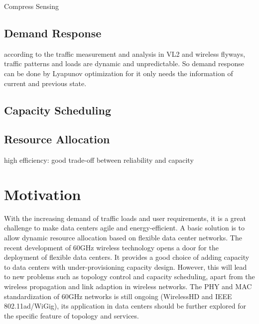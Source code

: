 \documentclass[journal,onecolumn,11pt]{IEEEtran}
\begin{document}
Compress Sensing

\subsection{Demand Response}

according to the traffic measurement and analysis in VL2 and wireless flyways, traffic patterns and loads are dynamic and unpredictable. So demand response can be done by Lyapunov optimization for it only needs the information of current and previous state.

\subsection{Capacity Scheduling}

\subsection{Resource Allocation}

high efficiency: good trade-off between reliability and capacity

\section{Motivation}

With the increasing demand of traffic loads and user requirements, it is a great challenge to make data centers agile and energy-efficient. A basic solution is to allow dynamic resource allocation based on flexible data center networks. The recent development of 60GHz wireless technology opens a door for the deployment of flexible data centers. It provides a good choice of adding capacity to data centers with under-provisioning capacity design. However, this will lead to new problems such as topology control and capacity scheduling, apart from the wireless propagation and link adaption in wireless networks. The PHY and MAC standardization of 60GHz networks is still ongoing (WirelessHD and IEEE 802.11ad/WiGig), its application in data centers should be further explored for the specific feature of topology and services.
\end{document}
